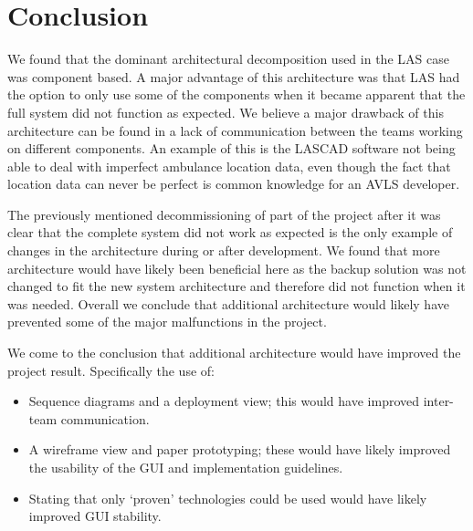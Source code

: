 \section*{Conclusion}

We found that the dominant architectural decomposition used in the LAS case was component based.
A major advantage of this architecture was that LAS had the option to only use some of the components when it became apparent that the full system did not function as expected.
We believe a major drawback of this architecture can be found in a lack of communication between the teams working on different components.
An example of this is the LASCAD software not being able to deal with imperfect ambulance location data,
even though the fact that location data can never be perfect is common knowledge for an AVLS developer.

The previously mentioned decommissioning of part of the project after it was clear that the complete system did not work as expected is the only example of changes in the architecture during or after development.
We found that more architecture would have likely been beneficial here as the backup solution was not changed to fit the new system architecture and therefore did not function when it was needed.
Overall we conclude that additional architecture would likely have prevented some of the major malfunctions in the project.

We come to the conclusion that additional architecture would have improved the project result.
Specifically the use of:
\begin{itemize}[noitemsep]
\item Sequence diagrams and a deployment view; this would have improved inter-team communication.
\item A wireframe view and paper prototyping; these would have likely improved the usability of the GUI and implementation guidelines.
\item Stating that only ‘proven’ technologies could be used would have likely improved GUI stability.
\end{itemize}

